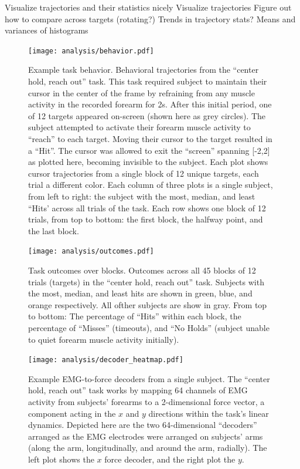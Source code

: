 \documentclass[../main.tex]{subfiles}
\begin{document}
Visualize trajectories and their statistics nicely
Visualize trajectories
Figure out how to compare across targets (rotating?)
Trends in trajectory stats? Means and variances of histograms



\begin{figure}
\centering
\texttt{[image: analysis/behavior.pdf]}
\caption{Example task behavior. Behavioral trajectories from the
``center hold, reach out'' task. This task required subject to maintain
their cursor in the center of the frame by refraining from any muscle
activity in the recorded forearm for 2s. After this initial period, one
of 12 targets appeared on-screen (shown here as grey circles). The
subject attempted to activate their forearm muscle activity to ``reach''    
to each target. Moving their cursor to the target resulted in a ``Hit''.
The cursor was allowed to exit the ``screen'' spanning {[}-2,2{]} as
plotted here, becoming invisible to the subject. Each plot shows cursor
trajectories from a single block of 12 unique targets, each trial a
different color. Each column of three plots is a single subject, from
left to right: the subject with the most, median, and least ``Hits'
across all trials of the task. Each row shows one block of 12 trials,
from top to bottom: the first block, the halfway point, and the last
block.}\label{fig:behavior}
\end{figure}

\begin{figure}
\centering
\texttt{[image: analysis/outcomes.pdf]}
\caption{Task outcomes over blocks. Outcomes across all 45 blocks of 12
trials (targets) in the ``center hold, reach out'' task. Subjects with
the most, median, and least hits are shown in green, blue, and orange
respectively. All ofther subjects are show in gray. From top to bottom:
The percentage of ``Hits'' within each block, the percentage of
``Misses'' (timeouts), and ``No Holds'' (subject unable to quiet forearm
muscle activity initially).}\label{fig:outcomes}
\end{figure}

\begin{figure}
\centering
\texttt{[image: analysis/decoder\_heatmap.pdf]}
\caption{Example EMG-to-force decoders from a single subject. The
``center hold, reach out'' task works by mapping 64 channels of EMG
activity from subjects' forearms to a 2-dimensional force vector, a
component acting in the \(x\) and \(y\) directions within the task's
linear dynamics. Depicted here are the two 64-dimensional ``decoders''
arranged as the EMG electrodes were arranged on subjects' arms (along
the arm, longitudinally, and around the arm, radially). The left plot
shows the \(x\) force decoder, and the right plot the
\(y\).}\label{fig:decoders}
\end{figure}
\end{document}
